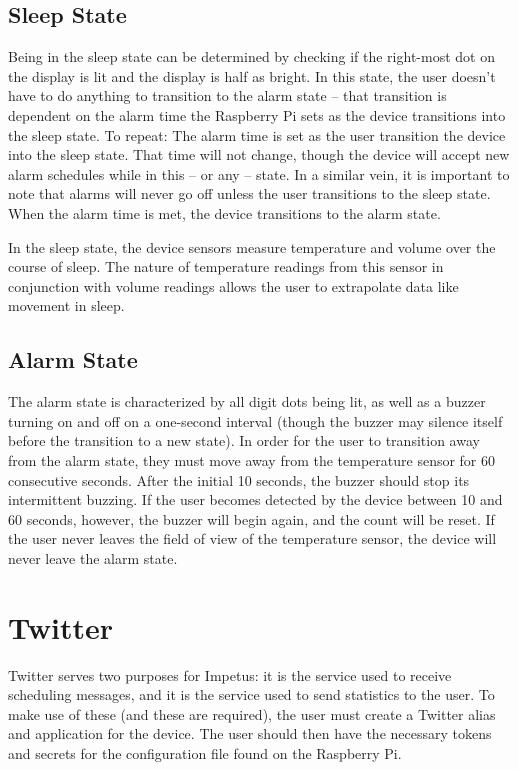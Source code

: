 \subsection{Sleep State}
Being in the sleep state can be determined by checking if the
right-most dot on the display is lit and the display is half as
bright. In this state, the user doesn't have to do anything to
transition to the alarm state -- that transition is dependent on the
alarm time the Raspberry Pi sets as the device transitions into the
sleep state. To repeat: The alarm time is set as the user transition
the device into the sleep state. That time will not change, though the
device will accept new alarm schedules while in this -- or any --
state. In a similar vein, it is important to note that alarms will
never go off unless the user transitions to the sleep state. When the
alarm time is met, the device transitions to the alarm state.

In the sleep state, the device sensors measure temperature and volume
over the course of sleep. The nature of temperature readings from this
sensor in conjunction with volume readings allows the user to
extrapolate data like movement in sleep.

\subsection{Alarm State}
The alarm state is characterized by all digit dots being lit, as well
as a buzzer turning on and off on a one-second interval (though the
buzzer may silence itself before the transition to a new state). In
order for the user to transition away from the alarm state, they must
move away from the temperature sensor for 60 consecutive
seconds. After the initial 10 seconds, the buzzer should stop its
intermittent buzzing. If the user becomes detected by the device
between 10 and 60 seconds, however, the buzzer will begin again, and
the count will be reset. If the user never leaves the field of view of
the temperature sensor, the device will never leave the alarm state.

\section{Twitter}
Twitter serves two purposes for Impetus: it is the service used to
receive scheduling messages, and it is the service used to send
statistics to the user. To make use of these (and these are required),
the user must create a Twitter alias and application for the
device. The user should then have the necessary tokens and secrets for
the configuration file found on the Raspberry Pi.

